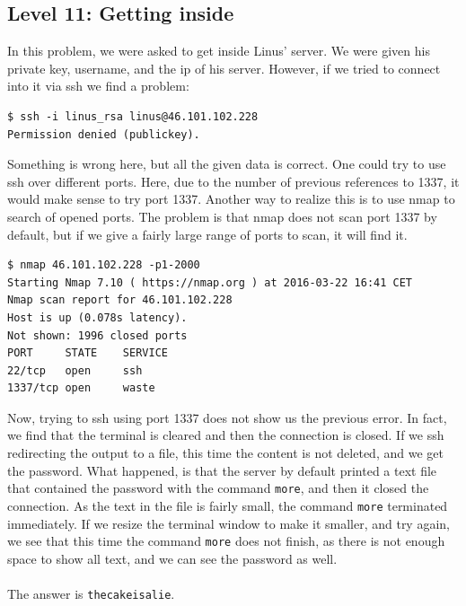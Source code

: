 \documentclass[paper=a4, fontsize=11pt]{scrartcl}	%
\begin{document}


\subsection*{Level 11: Getting inside}
In this problem, we were asked to get inside Linus' server. We were given his private key, username, and the ip of his server. However, if we tried to connect into it via ssh we find a problem:
\begin{verbatim}
$ ssh -i linus_rsa linus@46.101.102.228        
Permission denied (publickey).
\end{verbatim}

Something is wrong here, but all the given data is correct. One could try to use ssh over different ports. Here, due to the number of previous references to 1337, it would make sense to try port 1337. Another way to realize this is to use nmap to search of opened ports. The problem is that nmap does not scan port 1337 by default, but if we give a fairly large range of ports to scan, it will find it.

\begin{verbatim}
$ nmap 46.101.102.228 -p1-2000
Starting Nmap 7.10 ( https://nmap.org ) at 2016-03-22 16:41 CET
Nmap scan report for 46.101.102.228
Host is up (0.078s latency).
Not shown: 1996 closed ports
PORT     STATE    SERVICE
22/tcp   open     ssh
1337/tcp open     waste
\end{verbatim}

Now, trying to ssh using port 1337 does not show us the previous error. In fact, we find that the terminal is cleared and then the connection is closed. If we ssh redirecting the output to a file, this time the content is not deleted, and we get the password. What happened, is that the server by default printed a text file that contained the password with the command \texttt{more}, and then it closed the connection. As the text in the file is fairly small, the command \texttt{more} terminated immediately. If we resize the terminal window to make it smaller, and try again, we see that this time the command \texttt{more} does not finish, as there is not enough space to show all text, and we can see the password as well.
\\
\\
The answer is \texttt{thecakeisalie}.

\end{document}
